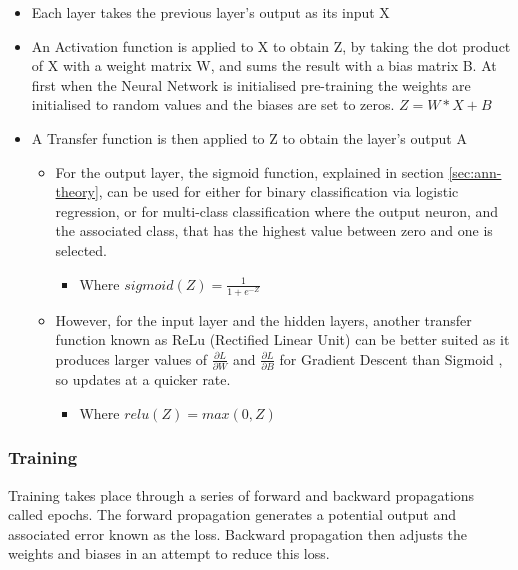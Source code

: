 \documentclass[./project-report/src/latex/project-report.tex]{subfiles}
\begin{document}
\begin{itemize}
    \item Each layer takes the previous layer's output as its input X
    \item An Activation function is applied to X to obtain Z, by taking the dot product of X with a weight matrix W, and sums the result with a bias matrix B. At 
          first when the Neural Network is initialised pre-training the weights are initialised to random values and the biases are set to zeros.
          $Z = W * X + B$
    \item A Transfer function is then applied to Z to obtain the layer's output A
    \begin{itemize}
        \item For the output layer, the sigmoid function, explained in section \ref{sec:ann-theory}, can be used for either for binary classification via logistic regression, 
			  or for multi-class classification where the output neuron, and the associated class, that has the highest value between zero and one is selected.
        \begin{itemize}
            \item Where $sigmoid(Z) = \frac{1}{1+e^{-Z}}$
        \end{itemize}
        \item However, for the input layer and the hidden layers, another transfer function known as ReLu (Rectified Linear Unit) can be better suited as it produces 
			larger values of $\frac{\partial{L}}{\partial{W}}$ and $\frac{\partial{L}}{\partial{B}}$ for Gradient Descent than Sigmoid \cite{nelson2023essential}, so updates 
			at a quicker rate.
        \begin{itemize}
            \item Where $relu(Z) = max(0, Z)$
        \end{itemize}
    \end{itemize}
\end{itemize}

\subsubsection{Training}

Training takes place through a series of forward and backward propagations called epochs. The forward propagation generates a potential output and associated error known as 
the loss. Backward propagation then adjusts the weights and biases in an attempt to reduce this loss.
\end{document}
